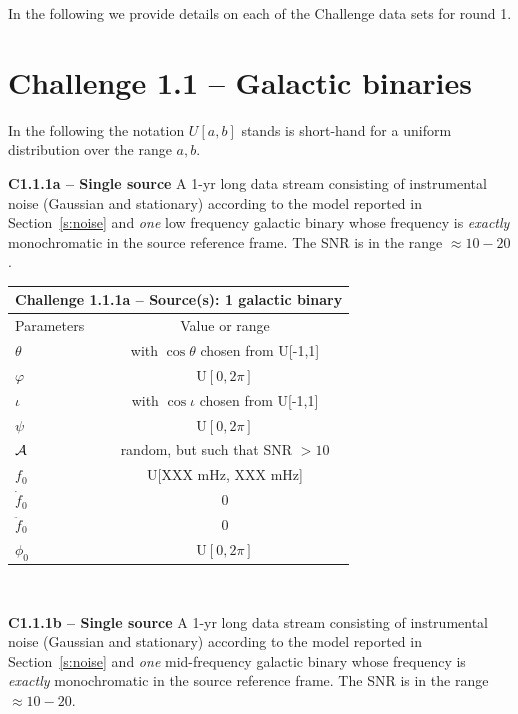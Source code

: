 \documentclass[11pt]{report}
\begin{document}
In the following we provide details on each of the Challenge data sets for round 1.


\section{Challenge 1.1 -- Galactic binaries}

In the following the notation $U[a,b]$ stands is short-hand for a uniform distribution over the range $a,b$.


\begin{description}

\item {\bf C1.1.1a -- Single source} A 1-yr long data stream consisting of instrumental noise (Gaussian and stationary) according to the model reported in Section~\ref{s:noise} and {\em one} low frequency galactic binary whose frequency is {\em exactly} monochromatic in the source reference frame. The SNR is in the range $\approx 10-20$. 

\begin{center}
\begin{tabular}{l|c}
\hline \hline
\multicolumn{2}{c}{{\bf Challenge 1.1.1a -- Source(s): 1 galactic binary}} \\
\hline
Parameters & Value or range \\
\hline
$\theta$          & with $\cos\theta$ chosen from U[-1,1]\\
$\varphi$         & U$[0,2\pi]$ \\ 
$\iota$           & with $\cos\iota$ chosen from U[-1,1]\\ 
$\psi$            & U$[0,2\pi]$ \\
${\cal A}$        & random, but such that SNR $> 10$ \\
$f_0$             & U[XXX mHz, XXX mHz] \\ 
$\dot{f}_0$       & 0 \\ 
$\ddot{f}_0$      & 0\\ 
$\phi_0$          & U$[0,2\pi]$ \\
\hline \hline
\end{tabular} \\
\end{center}


\item {\bf C1.1.1b -- Single source} A 1-yr long data stream consisting of instrumental noise (Gaussian and stationary) according to the model reported in Section~\ref{s:noise} and {\em one} mid-frequency galactic binary whose frequency is {\em exactly} monochromatic in the source reference frame. The SNR is in the range $\approx 10-20$. 


\end{description}
\end{document}
